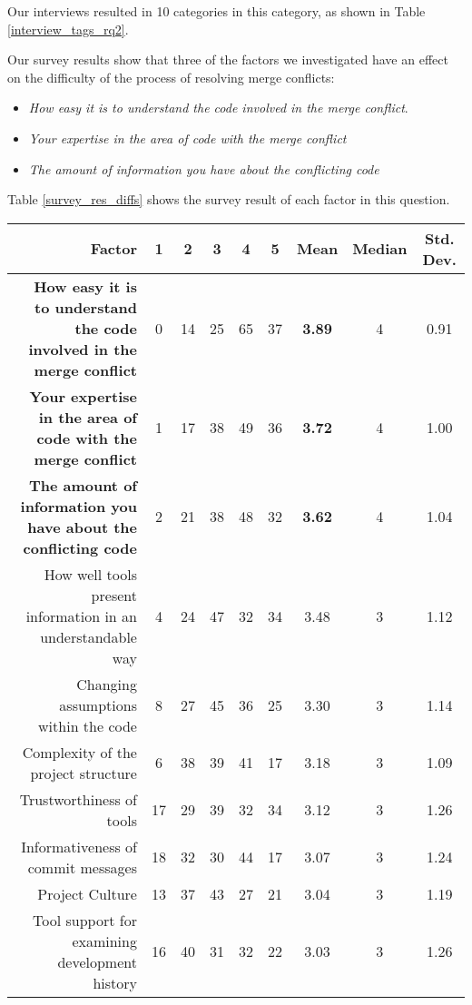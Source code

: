 Our interviews resulted in 10 categories in this category, as shown in Table \ref{interview_tags_rq2}.


Our survey results show that three of the factors we investigated have an effect on the difficulty of the process of resolving merge conflicts: 
\begin{itemize}
\item \textit{How easy it is to understand the code involved in the merge conflict}. 
\item \textit{Your expertise in the area of code with the merge conflict}
\item \textit{The amount of information you have about the conflicting code} 
\end{itemize}
Table \ref{survey_res_diffs} shows the survey result of each factor in this question.  

\begin{table*}[!]
\renewcommand{\arraystretch}{1.3}
\caption{Difficulties in Resolving a Merge Conflict from Survey}
\label{survey_res_diffs}
\centering
\begin{tabularx}{0.9\textwidth}{r | *5{c} | *3{c}}

\toprule
	Factor & 1 & 2 & 3 & 4 & 5 & Mean & Median & Std. Dev. \\
\midrule
	\textbf{How easy it is to understand the code involved in the merge conflict} & 0 & 14 & 25 & 65 & 37 & \textbf{3.89} & 4 & 0.91\\
	\textbf{Your expertise in the area of code with the merge conflict} & 1 & 17 & 38 & 49 & 36 & \textbf{3.72} & 4 & 1.00\\
	\textbf{The amount of information you have about the conflicting code} & 2 & 21 & 38 & 48 & 32 & \textbf{3.62} & 4 & 1.04\\
	How well tools present information in an understandable way & 4 & 24 & 47 & 32 & 34 & 3.48 & 3 & 1.12\\
	Changing assumptions within the code & 8 & 27 & 45 & 36 & 25 & 3.30 & 3 & 1.14\\
	Complexity of the project structure & 6 & 38 & 39 & 41 & 17 & 3.18 & 3 & 1.09\\
	Trustworthiness of tools & 17 & 29 & 39 & 32 & 34 & 3.12 & 3 & 1.26\\
	Informativeness of commit messages & 18 & 32 & 30 & 44 & 17 & 3.07 & 3 & 1.24\\
	Project Culture & 13 & 37 & 43 & 27 & 21 & 3.04 & 3 & 1.19\\
	Tool support for examining development history & 16 & 40 & 31 & 32 & 22 & 3.03 & 3 & 1.26\\
\bottomrule
\end{tabularx}
\end{table*}


